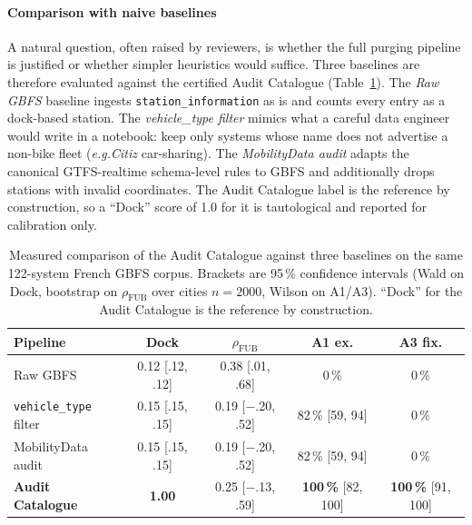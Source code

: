 \documentclass[a4paper,twoside]{article}
\newcommand{\eg}{\emph{e.g.}}
\begin{document}
\paragraph{Comparison with naive baselines}
A natural question, often raised by reviewers, is whether the
full purging pipeline is justified or whether simpler heuristics
would suffice. Three baselines are therefore evaluated against
the certified Audit Catalogue
(Table~\ref{tab:baselines}). The \emph{Raw GBFS} baseline
ingests \texttt{station\_information} as is and counts every
entry as a dock-based station. The \emph{vehicle\_type filter}
mimics what a careful data engineer would write in a notebook:
keep only systems whose name does not advertise a non-bike fleet
(\eg \emph{Citiz} car-sharing). The \emph{MobilityData audit}
adapts the canonical GTFS-realtime schema-level rules to GBFS
and additionally drops stations with invalid coordinates. The
Audit Catalogue label is the reference by construction, so a
``Dock'' score of 1.0 for it is tautological and reported for
calibration only.

\begin{table}[ht]
\centering
\caption{Measured comparison of the Audit Catalogue against three
baselines on the same 122-system French GBFS corpus. Brackets are
95\,\% confidence intervals (Wald on Dock, bootstrap on
$\rho_{\text{FUB}}$ over cities $n=2000$, Wilson on A1/A3).
``Dock'' for the Audit Catalogue is the reference by
construction.}
\label{tab:baselines}
\smalll
\begin{tabular}{@{}lcccc@{}}
\toprule
\textbf{Pipeline} &
\textbf{Dock} &
\textbf{$\rho_{\text{FUB}}$} &
\textbf{A1 ex.} &
\textbf{A3 fix.}\\
\midrule
Raw GBFS &
  0.12 \footnotesize[.12, .12] &
  0.38 \footnotesize[.01, .68] &
  0\,\% &
  0\,\% \\
\texttt{vehicle\_type} filter &
  0.15 \footnotesize[.15, .15] &
  0.19 \footnotesize[$-$.20, .52] &
  82\,\% \footnotesize[59, 94] &
  0\,\% \\
MobilityData audit &
  0.15 \footnotesize[.15, .15] &
  0.19 \footnotesize[$-$.20, .52] &
  82\,\% \footnotesize[59, 94] &
  0\,\% \\
\textbf{Audit Catalogue} &
  \textbf{1.00} &
  0.25 \footnotesize[$-$.13, .59] &
  \textbf{100\,\%} \footnotesize[82, 100] &
  \textbf{100\,\%} \footnotesize[91, 100] \\
\bottomrule
\end{tabular}
\end{table}
\end{document}
